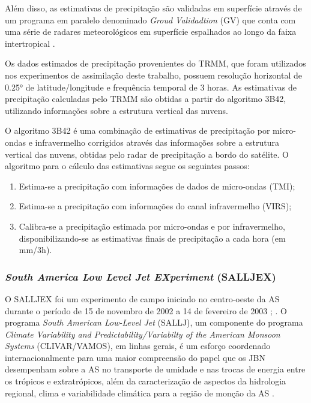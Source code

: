 Além disso, as estimativas de precipitação são validadas em superfície através de um programa em paralelo denominado \textit{Groud Validadtion} (GV) que conta com uma série de radares meteorológicos em superfície espalhados ao longo da faixa intertropical \cite{collischonnetal07}.

Os dados estimados de precipitação provenientes do TRMM, que foram utilizados nos experimentos de assimilação deste trabalho, possuem resolução horizontal de 0.25° de latitude/longitude e frequência temporal de 3 horas. As estimativas de precipitação calculadas pelo TRMM são obtidas a partir do algoritmo 3B42, utilizando informações sobre a estrutura vertical das nuvens.
    
O algoritmo 3B42 é uma combinação de estimativas de precipitação por micro-ondas e infravermelho corrigidos através das informações sobre a estrutura vertical das nuvens, obtidas pelo radar de precipitação a bordo do satélite. O algoritmo para o cálculo das estimativas segue os seguintes passos:

\begin{enumerate}
\item Estima-se a precipitação com informações de dados de micro-ondas (TMI);
\item Estima-se a precipitação com informações do canal infravermelho (VIRS);
\item Calibra-se a precipitação estimada por micro-ondas e por infravermelho, disponibilizando-se as estimativas finais de precipitação a cada hora (em mm/3h).
\end{enumerate}

\subsubsection{\textit{South America Low Level Jet EXperiment} (SALLJEX)}

O SALLJEX foi um experimento de campo iniciado no centro-oeste da AS durante o período de 15 de novembro de 2002 a 14 de fevereiro de 2003 \cite{vera06}; \cite{herdiesetal07}. O programa \textit{South American Low-Level Jet} (SALLJ), um componente do programa \textit{Climate Variability and Predictability/Variabilty of the American Monsoon Systems} (CLIVAR/VAMOS), em linhas gerais, é um esforço coordenado internacionalmente para uma maior compreensão do papel que os JBN desempenham sobre a AS no transporte de umidade e nas trocas de energia entre os trópicos e extratrópicos, além da caracterização de aspectos da hidrologia regional, clima e variabilidade climática para a região de monção da AS \cite{herdiesetal07}.


